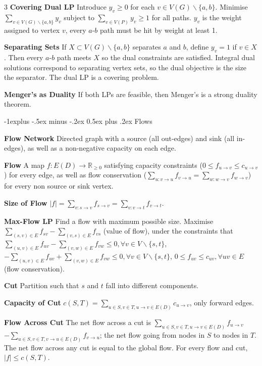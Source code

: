 \documentclass[10pt, landscape]{article}
\makeatletter
\renewcommand{\section}{\@startsection{section}{1}{0mm}%
                                {-1ex plus -.5ex minus -.2ex}%
                                {0.5ex plus .2ex}%
                                {\normalfont\large\bfseries}}
\renewcommand{\section}{\@startsection{section}{2}{0mm}%
                                {-1explus -.5ex minus -.2ex}%
                                {0.5ex plus .2ex}%
                                {\normalfont\normalsize\bfseries}}
\makeatother
\begin{document}
\begin{multicols*}{3}
\textbf{Covering Dual LP} Introduce $y_v \geq 0$ for each $v \in V(G) \backslash \{a,b\}$. Minimise $\sum_{v \in V(G) \backslash \{a, b\}}y_v$ subject to $\sum_{v \in V(P)} y_v \geq 1$ for all paths. $y_v$ is the weight assigned to vertex $v$, every $a$-$b$ path must be hit by weight at least 1.

\textbf{Separating Sets} If $X \subset V(G) \backslash \{a,b\}$ separates $a$ and $b$, define $y_v=1$ if $v \in X$. Then every $a$-$b$ path meets $X$ so the dual constraints are satisfied. Integral dual solutions correspond to separating vertex sets, so the dual objective is the size the separator. The dual LP is a covering problem.

\textbf{Menger's as Duality} If both LPs are feasible, then Menger's is a strong duality theorem.

\section{Flows}

\textbf{Flow Network} Directed graph with a source (all out-edges) and sink (all in-edges), as well as a non-negative capacity on each edge.

\textbf{Flow} A map $f:E(D) \rightarrow \mathbb{R}_{\geq0}$ satisfying capacity constraints ($0 \leq f_{u \rightarrow v} \leq c_{u \rightarrow v}$) for every edge, as well as flow conservation ($\sum_{u: v\rightarrow u}f_{v\rightarrow u}=\sum_{w: w\rightarrow v}f_{w\rightarrow v}$) for every non source or sink vertex.

\textbf{Size of Flow} $|f|=\sum_{v: s\rightarrow v}f_{s\rightarrow v}=\sum_{v: v\rightarrow t}f_{v\rightarrow t}$.

\textbf{Max-Flow LP} Find a flow with maximum possible size. Maximise $\sum_{(s,v)\in E}f_{sv}-\sum_{(v,s)\in E}f_{vs}$ (value of flow), under the constraints that $\sum_{(u, v)\in E}f_{uv}-\sum_{(v, w) \in E}f_{vw} \leq 0, \forall v \in V \backslash \{s, t\}$, $-\sum_{(u, v)\in E}f_{uv}+\sum_{(v, w) \in E}f_{vw} \leq 0, \forall v \in V \backslash \{s, t\}$, $0 \leq f_{uv} \leq c_{uv}, \forall uv \in E$ (flow conservation).

\textbf{Cut} Partition such that $s$ and $t$ fall into different components.

\textbf{Capacity of Cut} $c(S, T)=\sum_{u \in S, v \in T, u \rightarrow v \in E(D)}c_{u \rightarrow v}$, only forward edges.

\textbf{Flow Across Cut} The net flow across a cut is $\sum_{u \in S, v \in T, u \rightarrow v \in E(D)}f_{u \rightarrow v}$ $- \sum_{u \in S, v \in T, v \rightarrow u \in E(D)}f_{v \rightarrow u}$; the net flow going from nodes in $S$ to nodes in $T$. The net flow across any cut is equal to the global flow. For every flow and cut, $|f| \leq c(S, T)$.


\end{multicols*}
\end{document}
